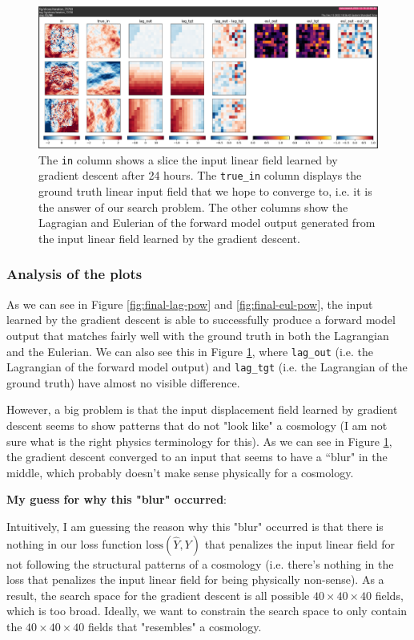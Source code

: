 \documentclass{article}
\begin{document}
\begin{figure}[h]
    \centering
    \includegraphics[width=16cm]{figs/final-displacements.png}
    \caption{The \texttt{in} column shows a slice the input linear field learned by gradient descent after 24 hours. The \texttt{true\_in} column displays the ground truth linear input field that we hope to converge to, i.e. it is the answer of our search problem. The other columns show the Lagragian and Eulerian of the forward model output generated from the input linear field learned by the gradient descent.}
    \label{fig:final-slices}
\end{figure}

\clearpage

\subsubsection{Analysis of the plots}

As we can see in Figure \ref{fig:final-lag-pow} and \ref{fig:final-eul-pow}, the input learned by the gradient descent is able to successfully produce a forward model output that matches fairly well with the ground truth in both the Lagrangian and the Eulerian. We can also see this in Figure \ref{fig:final-slices}, where \texttt{lag\_out} (i.e. the Lagrangian of the forward model output) and \texttt{lag\_tgt} (i.e. the Lagrangian of the ground truth) have almost no visible difference.

However, a big problem is that the input displacement field learned by gradient descent seems to show patterns that do not "look like" a cosmology (I am not sure what is the right physics terminology for this). As we can see in Figure \ref{fig:final-slices}, the gradient descent converged to an input that seems to have a ``blur" in the middle, which probably doesn't make sense physically for a cosmology.

\textbf{My guess for why this "blur" occurred}:

Intuitively, I am guessing the reason why this "blur" occurred is that there is nothing in our loss function $\mbox{loss}(\hat{Y}, Y)$ that penalizes the input linear field for not following the structural patterns of a cosmology (i.e. there's nothing in the loss that penalizes the input linear field for being physically non-sense). As a result, the search space for the gradient descent is all possible $40 \times 40 \times 40$ fields, which is too broad. Ideally, we want to constrain the search space to only contain the $40 \times 40 \times 40$ fields that "resembles" a cosmology.
\end{document}

